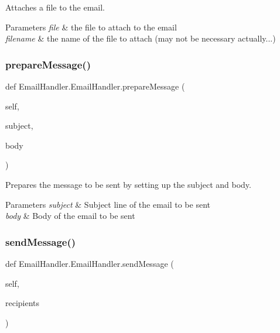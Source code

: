 Attaches a file to the email. 


\begin{DoxyParams}{Parameters}
{\em file} & the file to attach to the email \\
\hline
{\em filename} & the name of the file to attach (may not be necessary actually...) \\
\hline
\end{DoxyParams}
\mbox{\label{classEmailHandler_1_1EmailHandler_a738e27838ff55ce3ad5264b55f927570}} 
\subsubsection{\texorpdfstring{prepare\+Message()}{prepareMessage()}}
{\footnotesize\ttfamily def Email\+Handler.\+Email\+Handler.\+prepare\+Message (\begin{DoxyParamCaption}\item[{}]{self,  }\item[{}]{subject,  }\item[{}]{body }\end{DoxyParamCaption})}



Prepares the message to be sent by setting up the subject and body. 


\begin{DoxyParams}{Parameters}
{\em subject} & Subject line of the email to be sent \\
\hline
{\em body} & Body of the email to be sent \\
\hline
\end{DoxyParams}
\mbox{\label{classEmailHandler_1_1EmailHandler_a54db017e0c03dbf296b537f46ac181e6}} 
\subsubsection{\texorpdfstring{send\+Message()}{sendMessage()}}
{\footnotesize\ttfamily def Email\+Handler.\+Email\+Handler.\+send\+Message (\begin{DoxyParamCaption}\item[{}]{self,  }\item[{}]{recipients }\end{DoxyParamCaption})}



